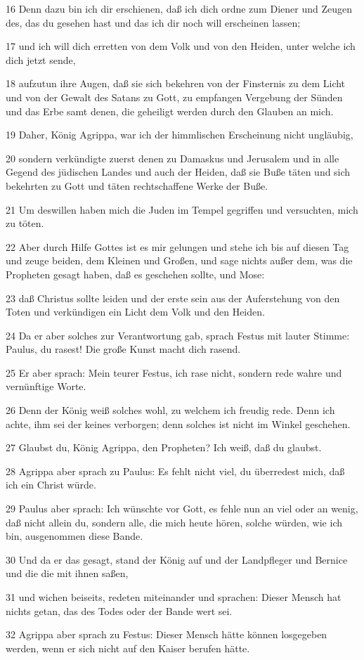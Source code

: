 \par 16 Denn dazu bin ich dir erschienen, daß ich dich ordne zum Diener und Zeugen des, das du gesehen hast und das ich dir noch will erscheinen lassen;
\par 17 und ich will dich erretten von dem Volk und von den Heiden, unter welche ich dich jetzt sende,
\par 18 aufzutun ihre Augen, daß sie sich bekehren von der Finsternis zu dem Licht und von der Gewalt des Satans zu Gott, zu empfangen Vergebung der Sünden und das Erbe samt denen, die geheiligt werden durch den Glauben an mich.
\par 19 Daher, König Agrippa, war ich der himmlischen Erscheinung nicht ungläubig,
\par 20 sondern verkündigte zuerst denen zu Damaskus und Jerusalem und in alle Gegend des jüdischen Landes und auch der Heiden, daß sie Buße täten und sich bekehrten zu Gott und täten rechtschaffene Werke der Buße.
\par 21 Um deswillen haben mich die Juden im Tempel gegriffen und versuchten, mich zu töten.
\par 22 Aber durch Hilfe Gottes ist es mir gelungen und stehe ich bis auf diesen Tag und zeuge beiden, dem Kleinen und Großen, und sage nichts außer dem, was die Propheten gesagt haben, daß es geschehen sollte, und Mose:
\par 23 daß Christus sollte leiden und der erste sein aus der Auferstehung von den Toten und verkündigen ein Licht dem Volk und den Heiden.
\par 24 Da er aber solches zur Verantwortung gab, sprach Festus mit lauter Stimme: Paulus, du rasest! Die große Kunst macht dich rasend.
\par 25 Er aber sprach: Mein teurer Festus, ich rase nicht, sondern rede wahre und vernünftige Worte.
\par 26 Denn der König weiß solches wohl, zu welchem ich freudig rede. Denn ich achte, ihm sei der keines verborgen; denn solches ist nicht im Winkel geschehen.
\par 27 Glaubst du, König Agrippa, den Propheten? Ich weiß, daß du glaubst.
\par 28 Agrippa aber sprach zu Paulus: Es fehlt nicht viel, du überredest mich, daß ich ein Christ würde.
\par 29 Paulus aber sprach: Ich wünschte vor Gott, es fehle nun an viel oder an wenig, daß nicht allein du, sondern alle, die mich heute hören, solche würden, wie ich bin, ausgenommen diese Bande.
\par 30 Und da er das gesagt, stand der König auf und der Landpfleger und Bernice und die die mit ihnen saßen,
\par 31 und wichen beiseits, redeten miteinander und sprachen: Dieser Mensch hat nichts getan, das des Todes oder der Bande wert sei.
\par 32 Agrippa aber sprach zu Festus: Dieser Mensch hätte können losgegeben werden, wenn er sich nicht auf den Kaiser berufen hätte.

